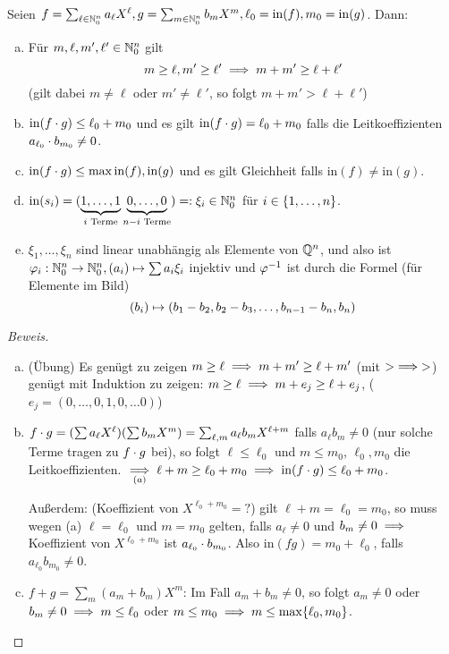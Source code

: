 \documentclass[a4paper]{report}
\begin{document}
\begin{prop}
  Seien $f = \sum_{\ell \in \mathbb{N}_0^{n}}a_{\ell} X^{\ell}, g = \sum_{m \in \mathbb{N}_0^{n}}b_{m} X^{m}, \ell_{0} = \mathrm{in}(f), m_{0} = \mathrm{in}(g)$. Dann:
  \begin{enumerate}[(a)]
    \item Für $m, \ell, m', \ell' \in \mathbb{N}_0^{n}$ gilt
          \[m \ge \ell, m' \ge \ell' \implies m+m' \ge \ell + \ell'\]
          (gilt dabei $m \ne \ell$ oder $m' \ne \ell'$, so folgt $m+m' > \ell + \ell'$)
    \item $\mathrm{in}(f \cdot g) \le \ell_{0}+m_{0}$ und es gilt $\mathrm{in}(f \cdot g) = \ell_{0} + m_{0}$ falls die Leitkoeffizienten $a_{\ell_{0}} \cdot b_{m_{0}} \ne 0$.
    \item $\mathrm{in}(f \cdot g) \le \max{\mathrm{in}(f), \mathrm{in}(g)}$ und es gilt Gleichheit falls $\mathrm{in}(f) \ne \mathrm{in}(g)$.
    \item $\mathrm{in}(s_{i}) = (\underbrace{1, \ldots, 1}_{i \text{ Terme}}\underbrace{0, \ldots, 0}_{n-i \text{ Terme}}) =: \xi_{i} \in \mathbb{N}_0^{n}$ für $i \in \{1, \ldots, n\}$.
    \item $\xi_{1}, \ldots, \xi_{n}$ sind linear unabhängig als Elemente von $\mathbb{Q}^{n}$, und also ist $\varphi_{i}: \mathbb{N}_0^{n} \to \mathbb{N}_0^{n}, (a_{i}) \mapsto \sum a_{i} \xi_{i}$ injektiv und $\varphi^{-1}$ ist durch die Formel (für Elemente im Bild) \[(b_{i}) \mapsto (b_{1}-b_{2}, b_{2}-b_{3}, \ldots, b_{n-1}-b_{n}, b_{n})\]
  \end{enumerate}
\begin{proof}[Beweis]
\begin{enumerate}[(a)]
  \item (Übung) Es genügt zu zeigen $m \ge \ell \implies m+m' \ge \ell+m'$ (mit $> \implies >$) genügt mit Induktion zu zeigen: $m \ge \ell \implies m + e_{j} \ge \ell + e_{j}$, ($e_{j} = (0, \ldots, 0,1,0, \ldots 0)$)
  \item $f \cdot g = (\sum a_{\ell}X^{\ell})(\sum b_{m}X^{m}) = \sum_{\ell, m}a_{\ell}b_{m}X^{\ell+m}$ falls $a_{\ell} b_{m} \ne 0$ (nur solche Terme tragen zu $f \cdot g$ bei), so folgt $\ell \le \ell_{0}$ und $m \le m_{0}$, $\ell_{0}, m_{0}$ die Leitkoeffizienten. $\underset{(a)}{\implies} \ell + m \ge \ell_{0} + m_{0} \implies \mathrm{in}(f \cdot g) \le \ell_{0} + m_{0}$.

  Außerdem: (Koeffizient von $X^{\ell_{0}+m_{0}} = ?$) gilt $\ell + m = \ell_{0}=m_{0}$, so muss wegen (a) $\ell = \ell_{0}$ und $m = m_{0}$ gelten, falls $a_{\ell} \ne 0$ und $b_{m} \ne 0 \implies $ Koeffizient von $X^{\ell_{0}+m_{0}}$ ist $a_{\ell_{0}}\cdot b_{m_{0}}$. Also $\mathrm{in}(fg) = m_{0} + \ell_{0}$, falls $a_{\ell_{0}} b_{m_{0}} \ne 0$.
  \item $f + g = \sum_{m}(a_{m} + b_{m})X^{m}$: Im Fall $a_{m} + b_{m} \ne 0$, so folgt $a_{m} \ne 0$ oder $b_{m} \ne 0 \implies m \le \ell_{0}$ oder $m \le m_{0} \implies m \le \max\{\ell_{0}, m_{0}\}$.


\end{enumerate}
\end{proof}
\end{prop}
\end{document}
